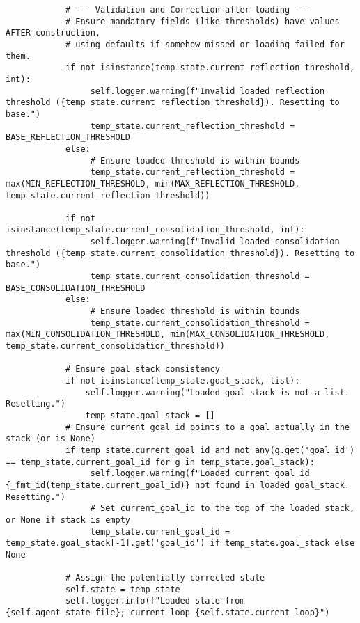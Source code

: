 \documentclass[12pt,a4paper]{article}
\begin{document}
\begin{pageablecode}
\begin{verbatim}
            # --- Validation and Correction after loading ---
            # Ensure mandatory fields (like thresholds) have values AFTER construction,
            # using defaults if somehow missed or loading failed for them.
            if not isinstance(temp_state.current_reflection_threshold, int):
                 self.logger.warning(f"Invalid loaded reflection threshold ({temp_state.current_reflection_threshold}). Resetting to base.")
                 temp_state.current_reflection_threshold = BASE_REFLECTION_THRESHOLD
            else:
                 # Ensure loaded threshold is within bounds
                 temp_state.current_reflection_threshold = max(MIN_REFLECTION_THRESHOLD, min(MAX_REFLECTION_THRESHOLD, temp_state.current_reflection_threshold))

            if not isinstance(temp_state.current_consolidation_threshold, int):
                 self.logger.warning(f"Invalid loaded consolidation threshold ({temp_state.current_consolidation_threshold}). Resetting to base.")
                 temp_state.current_consolidation_threshold = BASE_CONSOLIDATION_THRESHOLD
            else:
                 # Ensure loaded threshold is within bounds
                 temp_state.current_consolidation_threshold = max(MIN_CONSOLIDATION_THRESHOLD, min(MAX_CONSOLIDATION_THRESHOLD, temp_state.current_consolidation_threshold))

            # Ensure goal stack consistency
            if not isinstance(temp_state.goal_stack, list):
                self.logger.warning("Loaded goal_stack is not a list. Resetting.")
                temp_state.goal_stack = []
            # Ensure current_goal_id points to a goal actually in the stack (or is None)
            if temp_state.current_goal_id and not any(g.get('goal_id') == temp_state.current_goal_id for g in temp_state.goal_stack):
                 self.logger.warning(f"Loaded current_goal_id {_fmt_id(temp_state.current_goal_id)} not found in loaded goal_stack. Resetting.")
                 # Set current_goal_id to the top of the loaded stack, or None if stack is empty
                 temp_state.current_goal_id = temp_state.goal_stack[-1].get('goal_id') if temp_state.goal_stack else None

            # Assign the potentially corrected state
            self.state = temp_state
            self.logger.info(f"Loaded state from {self.agent_state_file}; current loop {self.state.current_loop}")


\end{verbatim}
\end{pageablecode}
\end{document}

